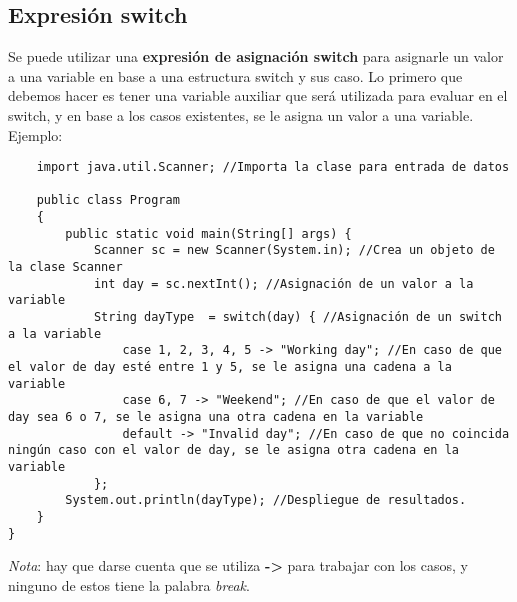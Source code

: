 \subsection{Expresión switch}
\hspace{0.55cm}Se puede utilizar una \textbf{expresión de asignación switch} para asignarle un valor a una variable en base a una estructura switch y sus caso. Lo primero que debemos hacer es tener una variable auxiliar que será utilizada para evaluar en el switch, y en base a los casos existentes, se le asigna un valor a una variable. Ejemplo:
\begin{lstlisting}
    import java.util.Scanner; //Importa la clase para entrada de datos
    
    public class Program
    {
        public static void main(String[] args) {
            Scanner sc = new Scanner(System.in); //Crea un objeto de la clase Scanner
            int day = sc.nextInt(); //Asignación de un valor a la variable
            String dayType  = switch(day) { //Asignación de un switch a la variable
                case 1, 2, 3, 4, 5 -> "Working day"; //En caso de que el valor de day esté entre 1 y 5, se le asigna una cadena a la variable
                case 6, 7 -> "Weekend"; //En caso de que el valor de day sea 6 o 7, se le asigna una otra cadena en la variable
                default -> "Invalid day"; //En caso de que no coincida ningún caso con el valor de day, se le asigna otra cadena en la variable
            };
        System.out.println(dayType); //Despliegue de resultados.
    }
} 
\end{lstlisting}

\textit{Nota}: hay que darse cuenta que se utiliza \textbf{->} para trabajar con los casos, y ninguno de estos tiene la palabra \textit{break}.
